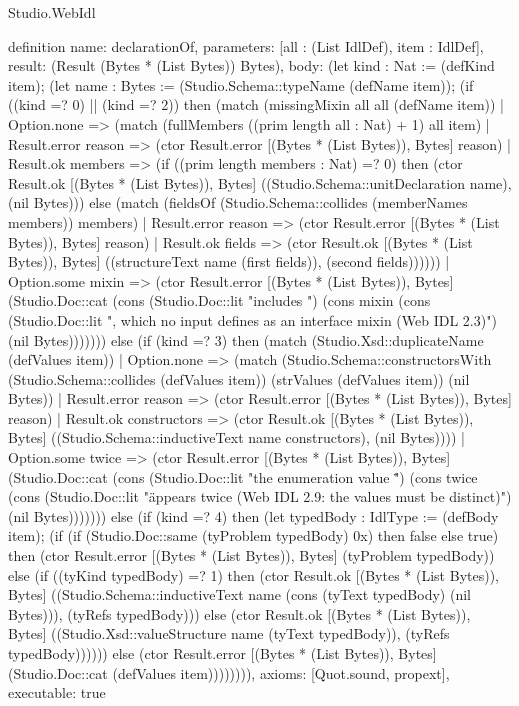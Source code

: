 \begin{lexlean}{Studio.WebIdl}
\begin{semanticmodule}
{{definition{
  name: declarationOf,
  parameters: [all : (List IdlDef), item : IdlDef],
  result: (Result (Bytes * (List Bytes)) Bytes),
  body: (let kind : Nat := (defKind item); (let name : Bytes := (Studio.Schema::typeName (defName item)); (if ((kind =? 0) || (kind =? 2)) then (match (missingMixin all all (defName item))
    | Option.none => (match (fullMembers ((prim length all : Nat) + 1) all item)
    | Result.error reason => (ctor Result.error [(Bytes * (List Bytes)), Bytes] reason)
    | Result.ok members => (if ((prim length members : Nat) =? 0) then (ctor Result.ok [(Bytes * (List Bytes)), Bytes] ((Studio.Schema::unitDeclaration name), (nil Bytes))) else (match (fieldsOf (Studio.Schema::collides (memberNames members)) members)
    | Result.error reason => (ctor Result.error [(Bytes * (List Bytes)), Bytes] reason)
    | Result.ok fields => (ctor Result.ok [(Bytes * (List Bytes)), Bytes] ((structureText name (first fields)), (second fields))))))
    | Option.some mixin => (ctor Result.error [(Bytes * (List Bytes)), Bytes] (Studio.Doc::cat (cons (Studio.Doc::lit "includes ") (cons mixin (cons (Studio.Doc::lit ", which no input defines as an interface mixin (Web IDL 2.3)") (nil Bytes))))))) else (if (kind =? 3) then (match (Studio.Xsd::duplicateName (defValues item))
    | Option.none => (match (Studio.Schema::constructorsWith (Studio.Schema::collides (defValues item)) (strValues (defValues item)) (nil Bytes))
    | Result.error reason => (ctor Result.error [(Bytes * (List Bytes)), Bytes] reason)
    | Result.ok constructors => (ctor Result.ok [(Bytes * (List Bytes)), Bytes] ((Studio.Schema::inductiveText name constructors), (nil Bytes))))
    | Option.some twice => (ctor Result.error [(Bytes * (List Bytes)), Bytes] (Studio.Doc::cat (cons (Studio.Doc::lit "the enumeration value \"") (cons twice (cons (Studio.Doc::lit "\" appears twice (Web IDL 2.9: the values must be distinct)") (nil Bytes))))))) else (if (kind =? 4) then (let typedBody : IdlType := (defBody item); (if (if (Studio.Doc::same (tyProblem typedBody) 0x) then false else true) then (ctor Result.error [(Bytes * (List Bytes)), Bytes] (tyProblem typedBody)) else (if ((tyKind typedBody) =? 1) then (ctor Result.ok [(Bytes * (List Bytes)), Bytes] ((Studio.Schema::inductiveText name (cons (tyText typedBody) (nil Bytes))), (tyRefs typedBody))) else (ctor Result.ok [(Bytes * (List Bytes)), Bytes] ((Studio.Xsd::valueStructure name (tyText typedBody)), (tyRefs typedBody)))))) else (ctor Result.error [(Bytes * (List Bytes)), Bytes] (Studio.Doc::cat (defValues item)))))))),
  axioms: [Quot.sound, propext],
  executable: true
}

}}
\end{semanticmodule}
\end{lexlean}

